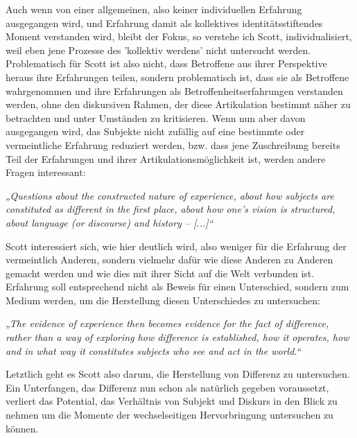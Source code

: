 \noindent Auch wenn von einer allgemeinen,
also keiner individuellen Erfahrung ausgegangen wird, und Erfahrung damit als
kollektives identitätsstiftendes Moment verstanden wird, bleibt der Fokus, so
verstehe ich Scott, individualisiert, weil eben jene Prozesse des 'kollektiv
werdens' nicht untersucht werden.\\
Problematisch für Scott ist also nicht, dass
Betroffene aus ihrer Perspektive heraus ihre Erfahrungen teilen, sondern
problematisch ist, dass sie als Betroffene wahrgenommen und ihre Erfahrungen
als Betroffenheitserfahrungen verstanden werden, ohne den diskursiven Rahmen,
der diese Artikulation bestimmt näher zu betrachten und unter Umständen zu
kritisieren. Wenn nun aber davon ausgegangen wird, das Subjekte nicht zufällig
auf eine bestimmte oder vermeintliche Erfahrung reduziert werden, bzw. dass
jene Zuschreibung bereits Teil der Erfahrungen und ihrer
Artikulationsmöglichkeit ist, werden andere Fragen interessant: 
\begin{myenv}
 \textit{„Questions about the constructed nature of experience, about how
 subjects are constituted as different in the first place, about how one's
vision is structured, about language (or discourse) and history – [...]“\footnotemark}
\end{myenv}
Scott interessiert sich, wie hier deutlich wird, also weniger für die Erfahrung
der vermeintlich Anderen, sondern vielmehr dafür wie diese Anderen zu Anderen
gemacht werden und wie dies mit ihrer Sicht auf die Welt verbunden ist.
Erfahrung soll entsprechend nicht als Beweis für einen Unterschied, sondern zum
Medium werden, um die Herstellung diesen Unterschiedes zu untersuchen:
\begin{myenv}
 \textit{„The evidence of experience then becomes evidence for the fact of difference, rather than a way of exploring how difference is established, how it operates, how and in what way it constitutes subjects who see and act in the world.“\footnotemark {}
}\end{myenv}
Letztlich geht es Scott also darum, die Herstellung von Differenz zu
untersuchen. Ein Unterfangen, das Differenz nun schon als natürlich gegeben
voraussetzt, verliert das Potential, das Verhältnis von Subjekt und Diskurs in
den Blick zu nehmen um die Momente der wechselseitigen Hervorbringung
untersuchen zu können. \\

